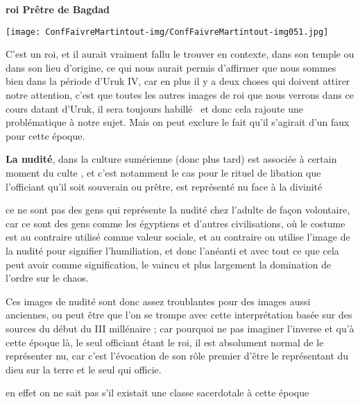 \documentclass[a4paper]{article}
\begin{document}
\bigskip

{
\textbf{roi Prêtre de Bagdad}}


\bigskip


\texttt{[image: ConfFaivreMartintout-img/ConfFaivreMartintout-img051.jpg]}



\bigskip


\bigskip

{
C'est un roi, et il aurait vraiment fallu le trouver en contexte, dans
son temple ou dans son lieu d'origine, ce qui nous aurait permis
d'affirmer que nous sommes bien dans la période d'Uruk IV, car en plus
il y a deux choses qui doivent attirer notre attention, c'est que
toutes les autres images de roi que nous verrons dans ce cours datant
d'Uruk, il sera toujours habillé \ et donc cela rajoute une
problématique à notre sujet. Mais on peut exclure le fait qu'il
s'agirait d'un faux pour cette époque.}


\bigskip

{
\textbf{La nudité}, dans la culture sumérienne (donc plus tard) est
associée à certain moment du culte , et c'est notamment le cas pour le
rituel de libation que l'officiant qu'il soit souverain ou prêtre, est
représenté nu face à la divinité}

{
ce ne sont pas des gens qui représente la nudité chez l'adulte de façon
volontaire, car ce sont des gens comme les égyptiens et d'autres
civilisations, où le costume est au contraire utilisé comme valeur
sociale, et au contraire on utilise l'image de la nudité pour signifier
l'humiliation, et donc l'anéanti et avec tout ce que cela peut avoir
comme signification, le vaincu et plus largement la domination de
l'ordre sur le chaos.}

{
Ces images de nudité sont donc assez troublantes pour des images aussi
anciennes, ou peut être que l'on se trompe avec cette interprétation
basée sur des sources du début du III millénaire ; car pourquoi ne pas
imaginer l'inverse et qu'à cette époque là, le seul officiant étant le
roi, il est absolument normal de le représenter nu, car c'est
l'évocation de son rôle premier d'être le représentant du dieu sur la
terre et le seul qui officie.}

{
en effet on ne sait pas s'il existait une classe sacerdotale à cette
époque}


\bigskip
\end{document}
